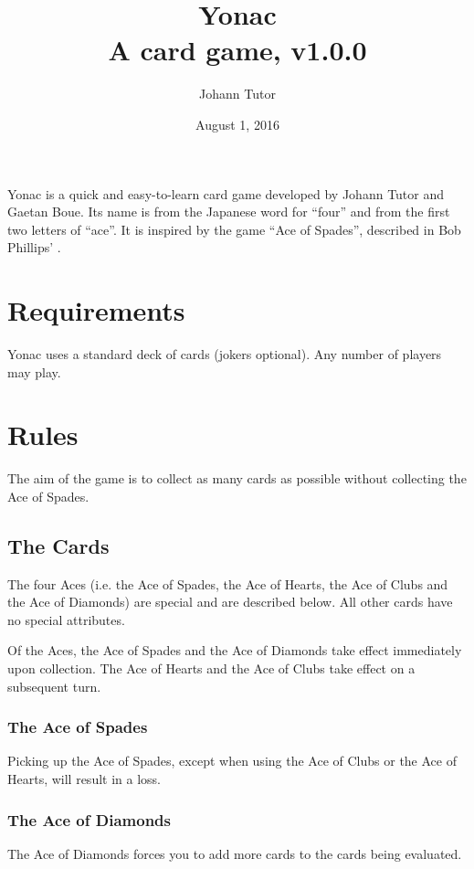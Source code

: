 \documentclass{article}
\newcommand\theversion{1.0.0}
\begin{document}
\title{Yonac\\ \large A card game, v\theversion}
\author{Johann Tutor}
\date{August 1, 2016}
\maketitle

Yonac is a quick and easy-to-learn card game developed by Johann Tutor
and Gaetan Boue. Its name is from the Japanese word for ``four'' and
from the first two letters of ``ace''. It is inspired by the game ``Ace
of Spades'', described in Bob Phillips'
.

\tableofcontents

\newpage

\section{Requirements}

Yonac uses a standard deck of cards (jokers optional). Any number of
players may play.

\section{Rules}

The aim of the game is to collect as many cards as possible without
collecting the Ace of Spades.

\subsection{The Cards}
\label{sec:cards}

The four Aces (i.e. the Ace of Spades, the Ace of Hearts, the Ace of Clubs
and the Ace of Diamonds) are special and are described below. All other
cards have no special attributes.

Of the Aces, the Ace of Spades and the Ace of Diamonds take effect
immediately upon collection. The Ace of Hearts and the Ace of Clubs take
effect on a subsequent turn.

\subsubsection{The Ace of Spades}
Picking up the Ace of Spades, except when using the Ace of Clubs or the
Ace of Hearts, will result in a loss.

\subsubsection{The Ace of Diamonds}
The Ace of Diamonds forces you to add more cards to the cards being
evaluated.
\end{document}

